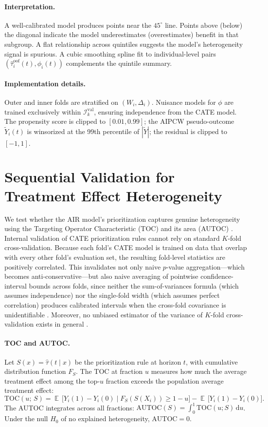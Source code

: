 \documentclass{article}
\DeclareMathOperator{\EX}{\mathbb{E}\,}
\newcommand{\nd}{\mathrm{d}}
\newcommand{\hattau}{\hat{\tau}}
\begin{document}
\paragraph{Interpretation.}
A well-calibrated model produces points near the $45^\circ$ line. Points above (below) the diagonal indicate the model underestimates (overestimates) benefit in that subgroup. A flat relationship across quintiles suggests the model's heterogeneity signal is spurious. A cubic smoothing spline fit to individual-level pairs $(\hattau^{\mathrm{oof}}_i(t), \phi_i(t))$ complements the quintile summary.

\paragraph{Implementation details.}
Outer and inner folds are stratified on $(W_i, \Delta_i)$. Nuisance models for $\phi$ are trained exclusively within $\mathcal{I}^{\mathrm{val}}_k$, ensuring independence from the CATE model. The propensity score is clipped to $[0.01, 0.99]$; the AIPCW pseudo-outcome $\tilde{Y}_i(t)$ is winsorized at the 99th percentile of $|\tilde{Y}|$; the residual is clipped to $[-1, 1]$.


\section{Sequential Validation for Treatment Effect Heterogeneity}\label{appendix:toc}

We test whether the AIR model's prioritization captures genuine heterogeneity using the Targeting Operator Characteristic (TOC) and its area (AUTOC) \citep{yadlowsky2025rate}. Internal validation of CATE prioritization rules cannot rely on standard $K$-fold cross-validation. Because each fold's CATE model is trained on data that overlap with every other fold's evaluation set, the resulting fold-level statistics are positively correlated. This invalidates not only naive $p$-value aggregation---which becomes anti-conservative---but also naive averaging of pointwise confidence-interval bounds across folds, since neither the sum-of-variances formula (which assumes independence) nor the single-fold width (which assumes perfect correlation) produces calibrated intervals when the cross-fold covariance is unidentifiable \citep{grf_rate_cv_vignette}. Moreover, no unbiased estimator of the variance of $K$-fold cross-validation exists in general \citep{bengio2004no}.

\paragraph{TOC and AUTOC.}
Let $S(x) = \hattau(t \mid x)$ be the prioritization rule at horizon $t$, with cumulative distribution function $F_S$. The TOC at fraction $u$ measures how much the average treatment effect among the top-$u$ fraction exceeds the population average treatment effect:
\[
\mathrm{TOC}(u;\, S) = \EX\bigl[Y_i(1) - Y_i(0) \mid F_S(S(X_i)) \geq 1 - u\bigr] - \EX\bigl[Y_i(1) - Y_i(0)\bigr].
\]
The AUTOC integrates across all fractions: $\mathrm{AUTOC}(S) = \int_0^1 \mathrm{TOC}(u; S)\, \nd u$. Under the null $H_0$ of no explained heterogeneity, $\mathrm{AUTOC} = 0$.
\end{document}
